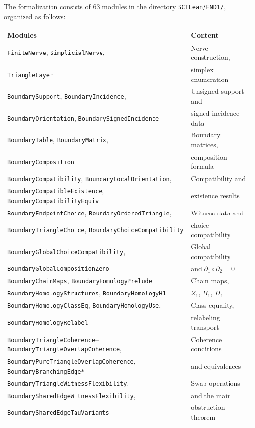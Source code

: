 \documentclass[11pt,a4paper]{article}
\theoremstyle{plain}
\theoremstyle{definition}
\theoremstyle{remark}
\begin{document}
The formalization consists of 63 modules in the directory
\texttt{SCTLean/FND1/}, organized as follows:

\medskip
\begin{center}
\small
\begin{tabular}{ll}
\toprule
\textbf{Modules} & \textbf{Content} \\
\midrule
\texttt{FiniteNerve}, \texttt{SimplicialNerve}, &
  Nerve construction, \\
\texttt{TriangleLayer} &
  simplex enumeration \\[3pt]
\texttt{BoundarySupport},
  \texttt{BoundaryIncidence}, &
  Unsigned support and \\
\texttt{BoundaryOrientation},
  \texttt{BoundarySignedIncidence} &
  signed incidence data \\[3pt]
\texttt{BoundaryTable},
  \texttt{BoundaryMatrix}, &
  Boundary matrices, \\
\texttt{BoundaryComposition} &
  composition formula \\[3pt]
\texttt{BoundaryCompatibility},
  \texttt{BoundaryLocalOrientation}, &
  Compatibility and \\
\texttt{BoundaryCompatibleExistence},
  \texttt{BoundaryCompatibilityEquiv} &
  existence results \\[3pt]
\texttt{BoundaryEndpointChoice},
  \texttt{BoundaryOrderedTriangle}, &
  Witness data and \\
\texttt{BoundaryTriangleChoice},
  \texttt{BoundaryChoiceCompatibility} &
  choice compatibility \\[3pt]
\texttt{BoundaryGlobalChoiceCompatibility}, &
  Global compatibility \\
\texttt{BoundaryGlobalCompositionZero} &
  and $\partial_1 \circ \partial_2 = 0$ \\[3pt]
\texttt{BoundaryChainMaps},
  \texttt{BoundaryHomologyPrelude}, &
  Chain maps, \\
\texttt{BoundaryHomologyStructures},
  \texttt{BoundaryHomologyH1} &
  $Z_1$, $B_1$, $H_1$ \\[3pt]
\texttt{BoundaryHomologyClassEq},
  \texttt{BoundaryHomologyUse}, &
  Class equality, \\
\texttt{BoundaryHomologyRelabel} &
  relabeling transport \\[3pt]
\texttt{BoundaryTriangleCoherence}--
  \texttt{BoundaryTriangleOverlapCoherence}, &
  Coherence conditions \\
\texttt{BoundaryPureTriangleOverlapCoherence},
  \texttt{BoundaryBranchingEdge*} &
  and equivalences \\[3pt]
\texttt{BoundaryTriangleWitnessFlexibility}, &
  Swap operations \\
\texttt{BoundarySharedEdgeWitnessFlexibility}, &
  and the main \\
\texttt{BoundarySharedEdgeTauVariants} &
  obstruction theorem \\
\bottomrule
\end{tabular}
\end{center}
\end{document}
